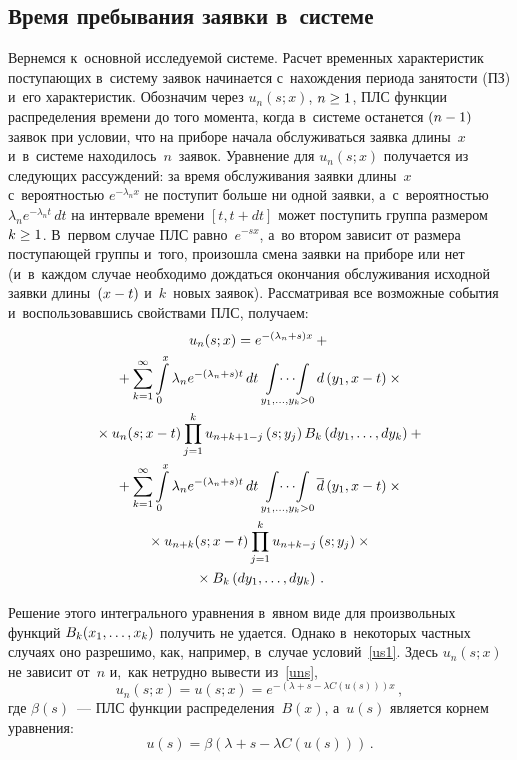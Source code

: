 \begin{multicols}{2}
\section{Время пребывания заявки в~системе}

Вернемся к~основной исследуемой системе.
Расчет временных характеристик поступающих в~сис\-те\-му заявок
начинается с~нахождения периода занятости (ПЗ) и~его характеристик.
Обозначим через $u_n(s;x)$, $n\hm\ge 1$, ПЛС функции распределения
времени до того момента,
когда в~системе останется $(n\hm-1)$ заявок при условии,
что на приборе начала обслуживаться заявка длины~$x$
и~в~системе находилось~$n$~заявок.
Уравнение для $u_n(s;x)$ получается из следующих рассуждений:
за время обслуживания заявки длины~$x$
с~вероятностью $e^{- \lambda_n x}$ не поступит больше ни одной
заявки, а~с~вероятностью $\lambda_n e^{- \lambda_n t}\,dt$
на интервале времени $[t,t+dt]$ может поступить
группа размером $k\hm\ge1$. В~первом случае ПЛС
равно~$e^{-sx}$, а~во втором зависит от размера
поступающей группы и~того, произошла смена заявки на приборе
или нет (и~в~каждом случае необходимо
дождаться окончания обслуживания исходной заявки длины~$(x\hm-t)$ и~$k$~новых заявок).
Рассматривая все возможные события и~воспользовавшись свойствами ПЛС, получаем:
\begin{multline}
u_{n}(s;x) = e^{- (\lambda_n+s) x}
+{}
\\
{}+
\sum\limits_{k=1}^\infty
\int\limits_0^x \lambda_n e^{- (\lambda_n+s) t} \, dt
\mathop{\int\!\cdots\!\int}\limits_{y_1,\ldots,y_{k}>0}
d\left(y_1,x-t\right)\times{}\\
{}\times u_n(s;x-t)
\prod\limits_{j=1}^k u_{n+k+1-j}\left(s;y_j\right) B_k\left(dy_1,\dots,dy_k\right)
+{}
\\
{}+
\sum\limits_{k=1}^\infty \int\limits_0^x
\lambda_n e^{- (\lambda_n+s) t} \, dt
\mathop{\int\!\cdots\!\int}\limits_{y_1,\ldots,y_{k}>0}
\overline d\left(y_1,x-t\right)\times{}\\
{}\times u_{n+k}(s;x-t) 
\prod\limits_{j=1}^k u_{n+k-j}\left(s;y_j\right)\times{}\\
{}\times
B_k\left(dy_1,\dots,dy_k\right)\,.
\label{uns}
\end{multline}

\noindent
Решение этого интегрального уравнения в~явном виде для произвольных 
функций $B_k(x_1,\ldots,x_k)$
получить не удается. Однако в~некоторых частных случаях оно разрешимо, как, например,
в~случае условий~\eqref{us1}. Здесь $u_{n}(s;x)$ не зависит
от~$n$ и,~как нетрудно вывести из~\eqref{uns},
$$
u_n(s;x)=u(s;x)=e^{-\left ( \lambda + s - \lambda C(u(s))\right ) x}\,,
$$
где $\beta(s)$~--- ПЛС функции распределения~$B(x)$,
а~$u(s)$ является корнем уравнения:
$$
u(s) = \beta \left (\lambda+s-\lambda C (u(s)) \right )\,.
$$


\end{multicols}
